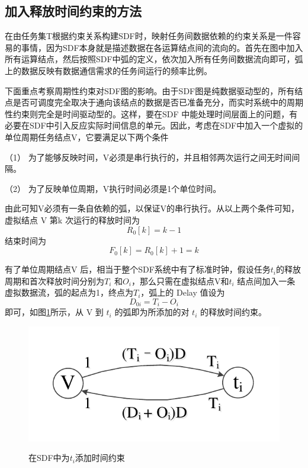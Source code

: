 \subsection{加入释放时间约束的方法}
\label{SDF-time-constraint}

在由任务集T根据约束关系构建SDF时，映射任务间数据依赖的约束关系是一件容易的事情，因为SDF本身就是描述数据在各运算结点间的流向的。首先在图中加入所有运算结点，然后按照SDF中弧的定义，依次加入所有任务间数据流向即可，弧上的数据反映有数据通信需求的任务间运行的频率比例。

下面重点考察周期性约束对SDF图的影响。由于SDF图是纯数据驱动型的，所有结点是否可调度完全取决于通向该结点的数据是否已准备充分，而实时系统中的周期性约束则完全是时间驱动型的。这样，要在SDF 中能处理时间层面上的问题，有必要在SDF中引入反应实际时间信息的单元。因此，考虑在SDF中加入一个虚拟的单位周期任务结点V，它要满足以下两个条件\label{SDF-V-conditions}

（1）	为了能够反映时间，V必须是串行执行的，并且相邻两次运行之间无时间间隔。

（2）	为了反映单位周期，V执行时间必须是1个单位时间。

由此可知V必须有一条自依赖的弧，以保证V的串行执行。从以上两个条件可知，虚拟结点 V 第k 次运行的释放时间为
\begin{equation}\label{SDF-eq-R0k}
  R_0[k]=k-1
\end{equation}
结束时间为
\begin{equation}\label{SDF-eq-F0k}
  F_0[k]=R_0[k]+1=k
\end{equation}

有了单位周期结点V 后，相当于整个SDF系统中有了标准时钟，假设任务$t_i$的释放周期和首次释放时间分别为$T_i$ 和$O_i$，那么只需在虚拟结点V和$t_i$ 结点间加入一条虚拟数据流，弧的起点为1，终点为$T_i$，弧上的 Delay 值设为
\begin{equation}
  \label{SDF-eq-r-time}
  D_{0i}=T_i-O_i
\end{equation}
即可，如图\ref{SDF-fig-time-constraint}所示，从 V 到 $t_i$ 的弧即为所添加的对 $t_i$ 的释放时间约束。

\begin{figure}[!hbt]
  \centering
  \includegraphics[height=13ex]{figure/SDF-time-constraint.pdf}\\
  \caption{在SDF中为$t_i$添加时间约束}\label{SDF-fig-time-constraint}
\end{figure}

